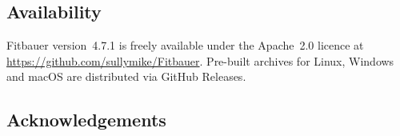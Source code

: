\documentclass[smallcondensed]{svjour3}
\begin{document}
\subsection*{Availability}

Fitbauer version~4.7.1 is freely available under the Apache~2.0 licence
at \url{https://github.com/sullymike/Fitbauer}. Pre-built archives
for Linux, Windows and macOS are distributed via GitHub Releases.

\subsection*{Acknowledgements}


\end{document}
